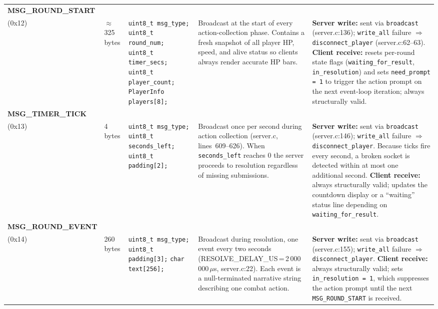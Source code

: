\documentclass[11pt,letterpaper]{article}
\begin{document}
\begin{longtable}{@{}p{1.8cm} p{1.2cm} p{2.4cm} p{4.2cm} p{4.8cm}@{}}
\textbf{MSG\_ROUND\_START}\\(0x12) &
$\approx$325 bytes &
\texttt{uint8\_t msg\_type;}\newline
\texttt{uint8\_t round\_num;}\newline
\texttt{uint8\_t timer\_secs;}\newline
\texttt{uint8\_t player\_count;}\newline
\texttt{PlayerInfo players[8];} &
Broadcast at the start of every action-collection phase. Contains a fresh snapshot of all player HP, speed, and alive status so clients always render accurate HP bars. &
\textbf{Server write:} sent via \texttt{broadcast} (server.c:136); \texttt{write\_all} failure $\Rightarrow$ \texttt{disconnect\_player} (server.c:62--63). \textbf{Client receive:} resets per-round state flags (\texttt{waiting\_for\_result}, \texttt{in\_resolution}) and sets \texttt{need\_prompt = 1} to trigger the action prompt on the next event-loop iteration; always structurally valid. \\[4pt]

\textbf{MSG\_TIMER\_TICK}\\(0x13) &
4 bytes &
\texttt{uint8\_t msg\_type;}\newline
\texttt{uint8\_t seconds\_left;}\newline
\texttt{uint8\_t padding[2];} &
Broadcast once per second during action collection (server.c, lines~609--626). When \texttt{seconds\_left} reaches 0 the server proceeds to resolution regardless of missing submissions. &
\textbf{Server write:} sent via \texttt{broadcast} (server.c:146); \texttt{write\_all} failure $\Rightarrow$ \texttt{disconnect\_player}. Because ticks fire every second, a broken socket is detected within at most one additional second. \textbf{Client receive:} always structurally valid; updates the countdown display or a ``waiting'' status line depending on \texttt{waiting\_for\_result}. \\[4pt]

\textbf{MSG\_ROUND\_EVENT}\\(0x14) &
260 bytes &
\texttt{uint8\_t msg\_type;}\newline
\texttt{uint8\_t padding[3];}\newline
\texttt{char text[256];} &
Broadcast during resolution, one event every two seconds (RESOLVE\_DELAY\_US\,=\,2\,000\,000\,$\mu$s, server.c:22). Each event is a null-terminated narrative string describing one combat action. &
\textbf{Server write:} sent via \texttt{broadcast} (server.c:155); \texttt{write\_all} failure $\Rightarrow$ \texttt{disconnect\_player}. \textbf{Client receive:} always structurally valid; sets \texttt{in\_resolution = 1}, which suppresses the action prompt until the next \texttt{MSG\_ROUND\_START} is received. \\[4pt]


\end{longtable}
\end{document}
